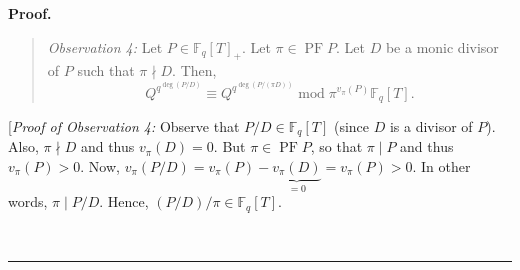 \documentclass[numbers=enddot,12pt,final,onecolumn,notitlepage]{scrartcl}%
\theoremstyle{definition}
\newenvironment{statement}{\begin{quote}}{\end{quote}}
\newenvironment{proof}[1][Proof]{\noindent\textbf{#1.} }{\ \rule{0.5em}{0.5em}}
\begin{document}
\begin{proof}
\begin{statement}
\textit{Observation 4:} Let $P\in\mathbb{F}_{q}\left[  T\right]  _{+}$. Let
$\pi\in\operatorname*{PF}P$. Let $D$ be a monic divisor of $P$ such that
$\pi\nmid D$. Then,
\[
Q^{q^{\deg\left(  P/D\right)  }}\equiv Q^{q^{\deg\left(  P/\left(  \pi
D\right)  \right)  }}\operatorname{mod}\pi^{v_{\pi}\left(  P\right)
}\mathbb{F}_{q}\left[  T\right]  .
\]

\end{statement}

[\textit{Proof of Observation 4:} Observe that $P/D\in\mathbb{F}_{q}\left[
T\right]  $ (since $D$ is a divisor of $P$). Also, $\pi\nmid D$ and thus
$v_{\pi}\left(  D\right)  =0$. But $\pi\in\operatorname*{PF}P$, so that
$\pi\mid P$ and thus $v_{\pi}\left(  P\right)  >0$. Now, $v_{\pi}\left(
P/D\right)  =v_{\pi}\left(  P\right)  -\underbrace{v_{\pi}\left(  D\right)
}_{=0}=v_{\pi}\left(  P\right)  >0$. In other words, $\pi\mid P/D$. Hence,
$\left(  P/D\right)  /\pi\in\mathbb{F}_{q}\left[  T\right]  $.


\end{proof}
\end{document}
